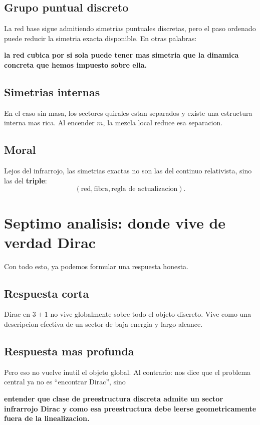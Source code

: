 \subsection{Grupo puntual discreto}
La red base sigue admitiendo simetrias puntuales discretas, pero el paso ordenado puede reducir la simetria exacta disponible. En otras palabras:
\begin{displayquote}
\textbf{la red cubica por si sola puede tener mas simetria que la dinamica concreta que hemos impuesto sobre ella.}
\end{displayquote}

\subsection{Simetrias internas}
En el caso sin masa, los sectores quirales estan separados y existe una estructura interna mas rica. Al encender \(m\), la mezcla local reduce esa separacion.

\subsection{Moral}
Lejos del infrarrojo, las simetrias exactas no son las del continuo relativista, sino las del \textbf{triple}:
\begin{equation}
(\text{red},\text{fibra},\text{regla de actualizacion}).
\end{equation}

\section{Septimo analisis: donde vive de verdad Dirac}
Con todo esto, ya podemos formular una respuesta honesta.

\subsection{Respuesta corta}
Dirac en \(3+1\) no vive globalmente sobre todo el objeto discreto. Vive como una descripcion efectiva de un sector de baja energia y largo alcance.

\subsection{Respuesta mas profunda}
Pero eso no vuelve inutil el objeto global. Al contrario: nos dice que el problema central ya no es \enquote{encontrar Dirac}, sino
\begin{displayquote}
\textbf{entender que clase de preestructura discreta admite un sector infrarrojo Dirac y como esa preestructura debe leerse geometricamente fuera de la linealizacion.}
\end{displayquote}


